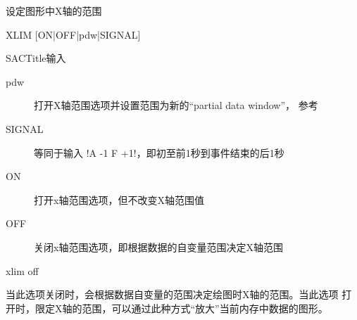\label{cmd:xlim}

设定图形中X轴的范围

\begin{SACSTX}
XLIM [ON|OFF|pdw|SIGNAL]
\end{SACSTX}

SACTitle{输入}
\begin{description}
\item [pdw] 打开X轴范围选项并设置范围为新的``partial data window''，
    参考 
\item [SIGNAL] 等同于输入 !A -1 F +1!，即初至前1秒到事件结束的后1秒
\item [ON] 打开x轴范围选项，但不改变X轴范围值
\item [OFF] 关闭x轴范围选项，即根据数据的自变量范围决定X轴范围
\end{description}

\begin{SACDFT}
xlim off
\end{SACDFT}

当此选项关闭时，会根据数据自变量的范围决定绘图时X轴的范围。当此选项
打开时，限定X轴的范围，可以通过此种方式``放大''当前内存中数据的图形。
